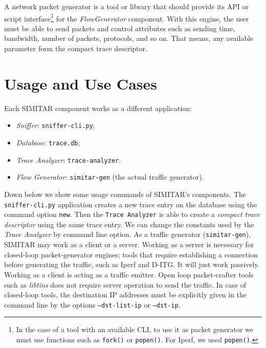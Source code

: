 A network packet generator is a tool or library that should provide its API or script interface\footnote{In the case of a tool with an available CLI, to use it as packet generator we must use functions such as \texttt{fork()} or \texttt{popen()}. For Iperf, we used \texttt{popen()}.} for the \textit{FlowGenerator} component. With this engine, the user must be able to send packets and control attributes such as sending time, bandwidth, number of packets, protocols, and so on. That means, any available parameter form the compact trace descriptor.
 

\section{Usage and Use Cases}

Each SIMITAR component works as a different application:

\begin{itemize}
    \item \textit{Sniffer}: \texttt{sniffer-cli.py};
    \item \textit{Database}: \texttt{trace.db};
    \item \textit{Trace Analyzer}: \texttt{trace-analyzer}.
    \item \textit{Flow Generator}: \texttt{simitar-gen} (the actual traffic generator).
\end{itemize}


Down below we show some usage commands of SIMITAR's components. The \texttt{sniffer-cli.py} application creates a new trace entry on the database using the command option \texttt{new}. Then the \texttt{Trace Analyzer} is able to create a \textit{compact trace descriptor} using the same trace entry. We can change the constants used by the \textit{Trace Analyzer} by command line option. As a traffic generator (\texttt{simitar-gen}), SIMITAR may work as a client or a server. Working as a server is necessary for closed-loop packet-generator engines; tools that require establishing a connection before generating the traffic, such as Iperf and D-ITG. It will just work passively. Working as a client is acting as a traffic emitter. Open loop packet-crafter tools such as \textit{libtins} does not require server operation to send the traffic. In case of closed-loop tools, the destination IP addresses must be explicitly given in the command line by the options \texttt{--dst-list-ip} or \texttt{--dst-ip}. 


